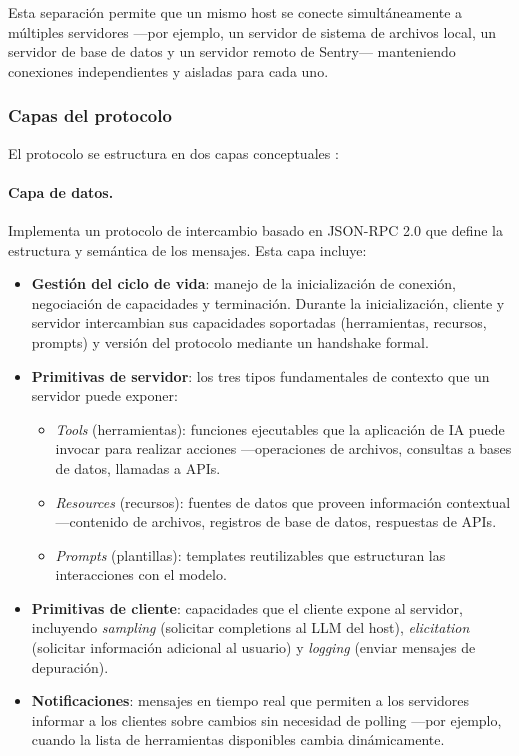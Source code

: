 Esta separación permite que un mismo host se conecte simultáneamente a
múltiples servidores ---por ejemplo, un servidor de sistema de archivos local,
un servidor de base de datos y un servidor remoto de Sentry--- manteniendo
conexiones independientes y aisladas para cada uno.

\subsubsection{Capas del protocolo}

El protocolo se estructura en dos capas conceptuales \citep{mcpspec2024}:

\paragraph{Capa de datos.} Implementa un protocolo de intercambio basado en
JSON-RPC 2.0 \citep{jsonrpc2010spec} que define la estructura y semántica de
los mensajes. Esta capa incluye:

\begin{itemize}
    \item \textbf{Gestión del ciclo de vida}: manejo de la inicialización de
    conexión, negociación de capacidades y terminación. Durante la
    inicialización, cliente y servidor intercambian sus capacidades soportadas
    (herramientas, recursos, prompts) y versión del protocolo mediante un
    handshake formal.

    \item \textbf{Primitivas de servidor}: los tres tipos fundamentales de
    contexto que un servidor puede exponer:
    \begin{itemize}
        \item \textit{Tools} (herramientas): funciones ejecutables que la
        aplicación de IA puede invocar para realizar acciones ---operaciones
        de archivos, consultas a bases de datos, llamadas a APIs.
        \item \textit{Resources} (recursos): fuentes de datos que proveen
        información contextual ---contenido de archivos, registros de base
        de datos, respuestas de APIs.
        \item \textit{Prompts} (plantillas): templates reutilizables que
        estructuran las interacciones con el modelo.
    \end{itemize}

    \item \textbf{Primitivas de cliente}: capacidades que el cliente expone al
    servidor, incluyendo \textit{sampling} (solicitar completions al LLM del
    host), \textit{elicitation} (solicitar información adicional al usuario) y
    \textit{logging} (enviar mensajes de depuración).

    \item \textbf{Notificaciones}: mensajes en tiempo real que permiten a los
    servidores informar a los clientes sobre cambios sin necesidad de polling
    ---por ejemplo, cuando la lista de herramientas disponibles cambia
    dinámicamente.
\end{itemize}

